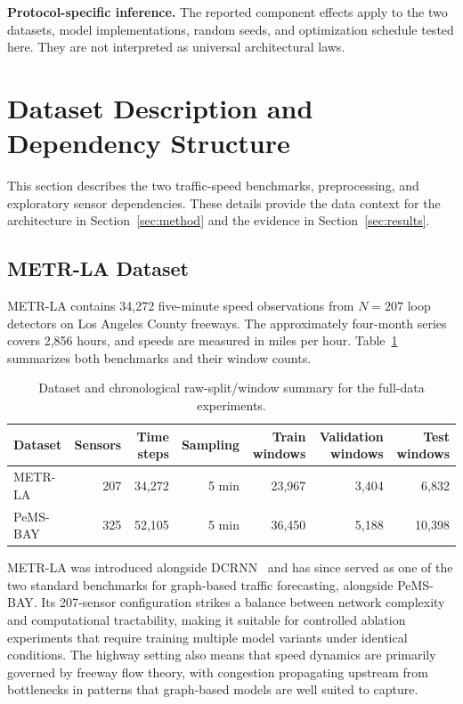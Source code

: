 \documentclass[fleqn,10pt]{wlscirep}
\newcommand{\chg}[1]{{\color{changeblue}#1}}
\newenvironment{changedcontent}{\color{changeblue}}{}
\begin{document}
\textbf{Protocol-specific inference.}
\begin{changedcontent}
The reported component effects apply to the two datasets, model
implementations, random seeds, and optimization schedule tested here. They
are not interpreted as universal architectural laws.
\end{changedcontent}

\section{Dataset Description and Dependency Structure}
\label{sec:data}

This section describes the two traffic-speed benchmarks, preprocessing, and
exploratory sensor dependencies. These details provide the data context for
the architecture in Section~\ref{sec:method} and the evidence in
Section~\ref{sec:results}.

\subsection{METR-LA Dataset}

METR-LA contains 34,272 five-minute speed observations from $N=207$ loop
detectors on Los Angeles County freeways. The approximately four-month series
covers 2,856 hours, and speeds are measured in miles per hour. Table~\ref{tab:dataset_stats}
summarizes both benchmarks and their window counts.



\begin{table}[htbp]
\centering
\caption{\chg{Dataset and chronological raw-split/window summary for the
full-data experiments.}}
\label{tab:dataset_stats}
{\color{changeblue}
\renewcommand{\arraystretch}{1.2}
\begin{tabular}{lrrrrrr}
\toprule
Dataset & Sensors & Time steps & Sampling & Train windows &
Validation windows & Test windows\\
\midrule
METR-LA & 207 & 34,272 & 5 min & 23,967 & 3,404 & 6,832\\
PeMS-BAY & 325 & 52,105 & 5 min & 36,450 & 5,188 & 10,398\\
\bottomrule
\end{tabular}}
\end{table}

METR-LA was introduced alongside DCRNN~\cite{li2018dcrnn} and has
since served as one of the two standard benchmarks for graph-based
traffic forecasting, alongside PeMS-BAY. Its 207-sensor configuration
strikes a balance between network complexity and computational
tractability, making it suitable for controlled ablation experiments
that require training multiple model variants under identical
conditions. The highway setting also means that speed dynamics are
primarily governed by freeway flow theory, with congestion
propagating upstream from bottlenecks in patterns that graph-based
models are well suited to capture.
\end{document}
